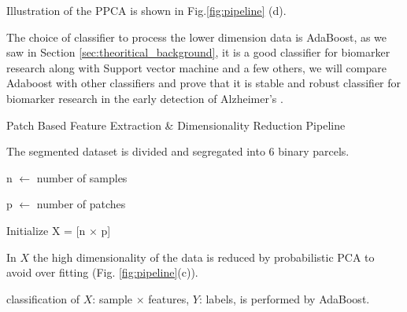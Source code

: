 \documentclass[authoryear,preprint,revi	ew,12pt]{elsarticle}
\newcommand{\Sec}[1]  {Section \ref{sec:#1}}
\newcommand{\Alz} {{Alzheimer\textquoteright s} }
\begin{document}
Illustration of the PPCA is shown in Fig.\ref{fig:pipeline} (d).

The choice of classifier to process the lower dimension data is AdaBoost, as we saw in \Sec{theoritical_background}, it is a good classifier for biomarker research along with Support vector machine and a few others, we will compare Adaboost with other classifiers and prove that it is stable and robust classifier for biomarker research in the early detection of \Alz.

\begin{algorithm}
	\caption{Patch Based Feature Extraction \& Dimensionality Reduction Pipeline}\label{alg:pipeline}
	
	
	The segmented dataset is divided and segregated into 6 binary parcels.
	
	 {
		
		n $ \gets $ number of samples
		
		p $ \gets $ number of patches
		
		Initialize X = [n $ \times $ p]
		
		
		In $ X $ the high dimensionality of the data is reduced by probabilistic PCA to avoid over fitting (Fig. \ref{fig:pipeline}(c)).
		
		classification of $ X $: sample $ \times $ features, $ Y $: labels, is performed by AdaBoost. 
	}
\end{algorithm}
\end{document}
